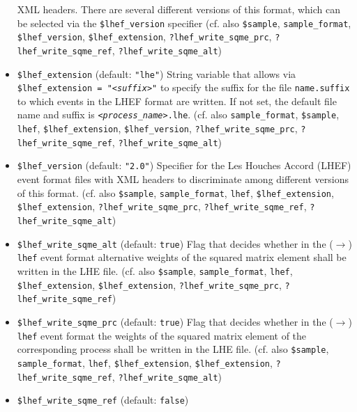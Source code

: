 \documentclass[12pt]{book}
\newcommand{\ttt}[1]{\texttt{#1}}
\begin{document}
\begin{itemize}
XML headers. There are several different versions of this format,
which can be selected via the \ttt{\$lhef\_version} specifier
(cf. also \ttt{\$sample}, \ttt{sample\_format}, \ttt{\$lhef\_version},
\ttt{\$lhef\_extension}, \ttt{?lhef\_write\_sqme\_prc},
\newline \ttt{?lhef\_write\_sqme\_ref}, \ttt{?lhef\_write\_sqme\_alt}) 
\item
\ttt{\$lhef\_extension} \qquad (default: \ttt{"lhe"}) \newline
String variable that allows via \ttt{\$lhef\_extension = "{\em <suffix>}"} to 
specify the suffix for the file \ttt{name.suffix} to which events in
the LHEF format are written. If not set, the default file name and suffix is
\ttt{{\em <process\_name>}.lhe}. (cf. also \ttt{sample\_format},
\ttt{\$sample}, \ttt{lhef}, \ttt{\$lhef\_extension},
\ttt{\$lhef\_version}, \ttt{?lhef\_write\_sqme\_prc},
\ttt{?lhef\_write\_sqme\_ref}, \ttt{?lhef\_write\_sqme\_alt})  
\item
\ttt{\$lhef\_version} \qquad (default: \ttt{"2.0"}) \newline 
Specifier for the Les Houches Accord (LHEF) event format files with
XML headers to discriminate among different versions of this format.
(cf. also \ttt{\$sample}, \ttt{sample\_format}, \ttt{lhef},
\ttt{\$lhef\_extension}, \ttt{\$lhef\_extension},
\ttt{?lhef\_write\_sqme\_prc}, \ttt{?lhef\_write\_sqme\_ref},
\ttt{?lhef\_write\_sqme\_alt})  
\item
\ttt{\$lhef\_write\_sqme\_alt} \qquad (default: \ttt{true}) \newline
Flag that decides whether in the ($\to$) \ttt{lhef} event format
alternative weights of the squared matrix element shall be written in
the LHE file. (cf. also \ttt{\$sample}, \ttt{sample\_format},
\ttt{lhef}, \ttt{\$lhef\_extension}, \ttt{\$lhef\_extension},
\ttt{?lhef\_write\_sqme\_prc}, \ttt{?lhef\_write\_sqme\_ref})   
\item
\ttt{\$lhef\_write\_sqme\_prc} \qquad (default: \ttt{true}) \newline
Flag that decides whether in the ($\to$) \ttt{lhef} event format the
weights of the squared matrix element of the corresponding process
shall be written in the LHE file. (cf. also \ttt{\$sample},
\ttt{sample\_format}, \ttt{lhef}, \ttt{\$lhef\_extension},
\ttt{\$lhef\_extension}, \ttt{?lhef\_write\_sqme\_ref},
\newline \ttt{?lhef\_write\_sqme\_alt})   
\item
\ttt{\$lhef\_write\_sqme\_ref} \qquad (default: \ttt{false}) \newline

\end{itemize}
\end{document}
